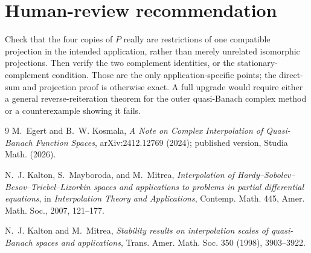 \documentclass[11pt]{article}
\begin{document}
\section*{Human-review recommendation}

Check that the four copies of $P$ really are restrictions of one compatible
projection in the intended application, rather than merely unrelated
isomorphic projections.  Then verify the two complement identities, or the
stationary-complement condition.  Those are the only application-specific
points; the direct-sum and projection proof is otherwise exact.  A full upgrade
would require either a general reverse-reiteration theorem for the outer
quasi-Banach complex method or a counterexample showing it fails.

\begin{thebibliography}{9}
M.~Egert and B.~W. Kosmala,
\emph{A Note on Complex Interpolation of Quasi-Banach Function Spaces},
arXiv:2412.12769 (2024); published version, Studia Math. (2026).

N.~J. Kalton, S.~Mayboroda, and M.~Mitrea,
\emph{Interpolation of Hardy--Sobolev--Besov--Triebel--Lizorkin spaces and
applications to problems in partial differential equations},
in \emph{Interpolation Theory and Applications}, Contemp. Math. 445,
Amer. Math. Soc., 2007, 121--177.

N.~J. Kalton and M.~Mitrea,
\emph{Stability results on interpolation scales of quasi-Banach spaces and
applications}, Trans. Amer. Math. Soc. 350 (1998), 3903--3922.
\end{thebibliography}
\end{document}

